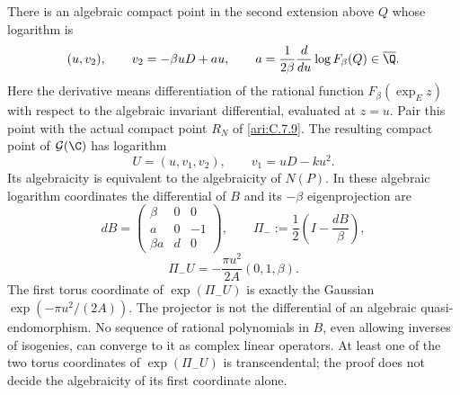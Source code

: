 \begin{proposition}
There is an algebraic compact point in the second extension
above $Q$ whose logarithm is
\[
 (u,v_2),\qquad v_2=-\beta uD+au,
 \qquad
 a=\frac1{2\beta}
       \frac{d}{du}\log F_\beta(Q)\in\overline\Q.
\]
Here the derivative means differentiation of the rational
function $F_\beta(\exp_E z)$ with respect to the algebraic
invariant differential, evaluated at $z=u$.
Pair this point with the actual compact point $R_N$ of
\ref{ari:C.7.9}. The resulting compact point of $\mathcal G(\C)$
has logarithm
\[
 U=(u,v_1,v_2),\qquad v_1=uD-ku^2.
\]
Its algebraicity is equivalent to the algebraicity of $N(P)$.
In these algebraic logarithm coordinates the differential of
$B$ and its $-\beta$ eigenprojection are
\[
 dB=\begin{pmatrix}
 \beta&0&0\\ a&0&-1\\ \beta a&d&0
 \end{pmatrix},\qquad
 \Pi_-:=\frac12\left(I-\frac{dB}{\beta}\right),
\]
\[
 \Pi_-U=-\frac{\pi u^2}{2A}(0,1,\beta).
\]
The first torus coordinate of $\exp(\Pi_-U)$ is exactly
the Gaussian $\exp(-\pi u^2/(2A))$. The projector is not
the differential of an algebraic quasi-endomorphism. No
sequence of rational polynomials in $B$, even allowing
inverses of isogenies, can converge to it as complex linear
operators. At least one of the two torus coordinates of
$\exp(\Pi_-U)$ is transcendental; the proof does not decide the
algebraicity of its first coordinate alone.
\end{proposition}


